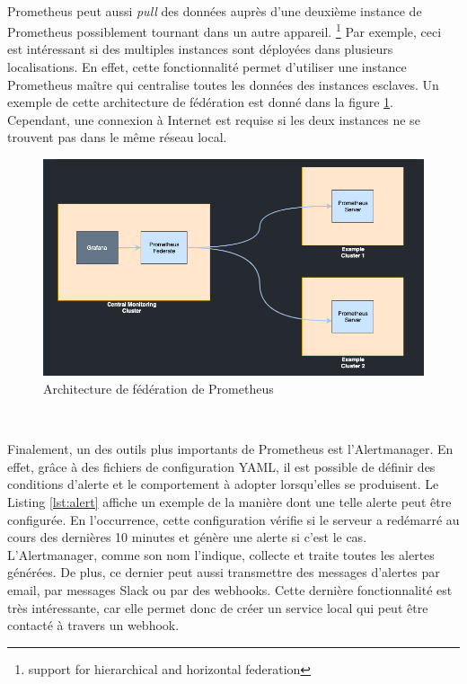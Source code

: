 ~

\noindent
Prometheus peut aussi \textit{pull} des données auprès d’une deuxième instance de Prometheus possiblement tournant dans un autre appareil. \footnote{support for hierarchical and horizontal federation} Par exemple, ceci est intéressant si des multiples instances sont déployées dans plusieurs localisations. En effet, cette fonctionnalité permet d’utiliser une instance Prometheus maître qui centralise toutes les données des instances esclaves. Un exemple de cette architecture de fédération est donné dans la figure \ref{fig:prom_fed}. Cependant, une connexion à Internet est requise si les deux instances ne se trouvent pas dans le même réseau local.


\begin{figure}[ht!]
  \includegraphics[width=\textwidth]{img/app/prometheus_federate.png}
  \caption{Architecture de fédération de Prometheus \cite{prometheus_federation}}
  \label{fig:prom_fed}
\end{figure}

~

\noindent
Finalement, un des outils plus importants de Prometheus est l’Alertmanager. En effet, grâce à des fichiers de configuration YAML, il est possible de définir des conditions d’alerte et le comportement à adopter lorsqu'elles se produisent. Le Listing \ref{lst:alert} affiche un exemple de la manière dont une telle alerte peut être configurée. En l'occurrence, cette configuration vérifie si le serveur a redémarré au cours des dernières 10 minutes et génère une alerte si c’est le cas. L’Alertmanager, comme son nom l’indique, collecte et traite toutes les alertes générées. De plus, ce dernier peut aussi transmettre des messages d’alertes par email, par messages Slack ou par des webhooks. Cette dernière fonctionnalité est très intéressante, car elle permet donc de créer un service local qui peut être contacté à travers un webhook.

